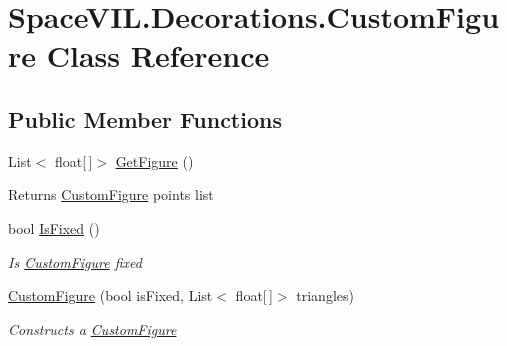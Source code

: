 \hypertarget{class_space_v_i_l_1_1_decorations_1_1_custom_figure}{}\section{Space\+V\+I\+L.\+Decorations.\+Custom\+Figure Class Reference}
\label{class_space_v_i_l_1_1_decorations_1_1_custom_figure}
\subsection*{Public Member Functions}
\begin{DoxyCompactItemize}
\item 
\mbox{\label{class_space_v_i_l_1_1_decorations_1_1_custom_figure_a5922fb25a2daa5a3a8d0f738b33cbb02}} 
List$<$ float\mbox{[}$\,$\mbox{]}$>$ \mbox{\hyperlink{class_space_v_i_l_1_1_decorations_1_1_custom_figure_a5922fb25a2daa5a3a8d0f738b33cbb02}{Get\+Figure}} ()
\begin{DoxyCompactList}\small\item\em \begin{DoxyReturn}{Returns}
\mbox{\hyperlink{class_space_v_i_l_1_1_decorations_1_1_custom_figure}{Custom\+Figure}} points list 
\end{DoxyReturn}
\end{DoxyCompactList}\item 
bool \mbox{\hyperlink{class_space_v_i_l_1_1_decorations_1_1_custom_figure_a4b2ff5319a7d0b34076da118107ee937}{Is\+Fixed}} ()
\begin{DoxyCompactList}\small\item\em Is \mbox{\hyperlink{class_space_v_i_l_1_1_decorations_1_1_custom_figure}{Custom\+Figure}} fixed \end{DoxyCompactList}\item 
\mbox{\hyperlink{class_space_v_i_l_1_1_decorations_1_1_custom_figure_a0177c625ad2cf4b4ea3295b81cfd348b}{Custom\+Figure}} (bool is\+Fixed, List$<$ float\mbox{[}$\,$\mbox{]}$>$ triangles)
\begin{DoxyCompactList}\small\item\em Constructs a \mbox{\hyperlink{class_space_v_i_l_1_1_decorations_1_1_custom_figure}{Custom\+Figure}} \end{DoxyCompactList}\item 
\mbox{\label{class_space_v_i_l_1_1_decorations_1_1_custom_figure_adb4c9e835ae9daf135f21c8c7133f99c}} 

\end{DoxyCompactItemize}
